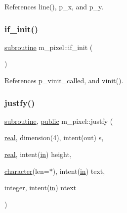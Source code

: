 References line(), p\+\_\+x, and p\+\_\+y.

\mbox{\label{namespacem__pixel_a6c23c2779e54da4ac7505cfb816cc2b1}} 
\subsubsection{\texorpdfstring{if\+\_\+init()}{if\_init()}}
{\footnotesize\ttfamily \hyperlink{M__stopwatch_83_8txt_acfbcff50169d691ff02d4a123ed70482}{subroutine} m\+\_\+pixel\+::if\+\_\+init (\begin{DoxyParamCaption}{ }\end{DoxyParamCaption})\hspace{0.3cm}{\ttfamily [private]}}



References p\+\_\+vinit\+\_\+called, and vinit().

\mbox{\label{namespacem__pixel_a7b08886c913b47694edeb60fa747afc4}} 
\subsubsection{\texorpdfstring{justfy()}{justfy()}}
{\footnotesize\ttfamily \hyperlink{M__stopwatch_83_8txt_acfbcff50169d691ff02d4a123ed70482}{subroutine}, \hyperlink{M__stopwatch_83_8txt_a2f74811300c361e53b430611a7d1769f}{public} m\+\_\+pixel\+::justfy (\begin{DoxyParamCaption}\item[{\hyperlink{read__watch_83_8txt_abdb62bde002f38ef75f810d3a905a823}{real}, dimension(4), intent(out)}]{s,  }\item[{\hyperlink{read__watch_83_8txt_abdb62bde002f38ef75f810d3a905a823}{real}, intent(\hyperlink{M__journal_83_8txt_afce72651d1eed785a2132bee863b2f38}{in})}]{height,  }\item[{\hyperlink{option__stopwatch_83_8txt_abd4b21fbbd175834027b5224bfe97e66}{character}(len=$\ast$), intent(\hyperlink{M__journal_83_8txt_afce72651d1eed785a2132bee863b2f38}{in})}]{text,  }\item[{integer, intent(\hyperlink{M__journal_83_8txt_afce72651d1eed785a2132bee863b2f38}{in})}]{ntext }\end{DoxyParamCaption})}



